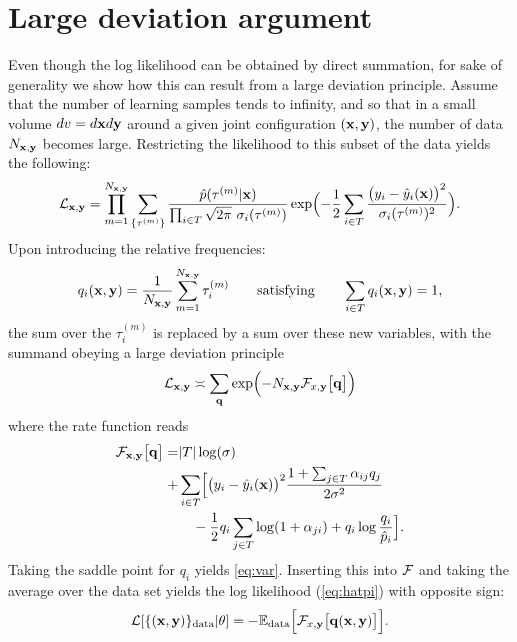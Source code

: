 \section*{Large deviation argument}
Even though the log likelihood can be obtained by direct summation, for sake of 
generality we show how this can result from a large deviation principle.
Assume that the number of learning samples tends to infinity, and so that in a 
small volume $dv = d\mathbf{x} d{\bf y}$ around a given joint configuration 
$(\mathbf{x},{\bf y})$, the number of data $N_{\mathbf{x},{\bf y}}$ becomes large. 
Restricting the likelihood to this subset of the data yields the following:
\[
{\cal L}_{\mathbf{x},{\bf y}} = \prod_{m=1}^{N_{\mathbf{x},{\bf y}}} \sum_{\{\tau^{(m)}\}} 
\frac{\hat p(\tau^{(m)}\vert \mathbf{x})}{\prod_{i\in  T}\sqrt{2\pi}\ \sigma_i(\tau^{(m)})}
\exp\Bigl(-\frac{1}{2}\sum_{i\in  T}\frac{\bigl(y_i-\hat y_i(\mathbf{x})\bigr)^2}{\sigma_i(\tau^{(m)})^2}\Bigr).
\]
Upon introducing the relative frequencies:
\[
q_i(\mathbf{x},{\bf y}) = \frac{1}{N_{\mathbf{x},{\bf y}}}\sum_{m=1}^{N_{\mathbf{x},{\bf y}}} \tau_i^{(m)} 
\qquad\text{satisfying}\qquad 
\sum_{i\in  T} q_i(\mathbf{x},{\bf y}) = 1,
\]
the sum over the $\tau_i^{(m)}$ is replaced by a sum over these new variables, 
with the summand obeying a large deviation principle 
\[
{\cal L}_{\mathbf{x},{\bf y}} \asymp \sum_{{\bf q}} 
\exp\Bigl(-N_{\mathbf{x},{\bf y}} {\cal F}_{x,{\bf y}}\bigl[{\bf q}\bigr]\Bigr)
\]
where the rate function reads
\begin{align*}
  {\cal F}_{\mathbf{x},{\bf y}}\bigl[{\bf q}\bigr] =& \vert T\vert\log(\sigma) \\
  +& \sum_{i\in  T}\Bigl[\bigl(y_i-\hat y_i(\mathbf{x})\bigr)^2\frac{1+\sum_{j\in  T}\alpha_{ij}q_j}{2\sigma^2} \\
  & \ \ \ - \frac{1}{2}q_i\sum_{j\in  T}\log(1+\alpha_{ji})+q_i\log\frac{q_i}{\hat p_i}\Bigr].
\end{align*}
Taking the saddle point for $q_i$ yields %
\cref{eq:var}. Inserting this into ${\cal F}$ and taking
the average over the data set yields the log likelihood (\cref{eq:hatpi}) with 
opposite sign:
\[
{\cal L}[\{(\mathbf{x},{\bf y})\}_{\rm data}\vert\theta]
 = -{\mathbb E}_{\rm data}\Bigl[{\cal F}_{x,{\bf y}}\bigl[{\bf q}(\mathbf{x},{\bf y})\bigr]\Bigr].
\]

